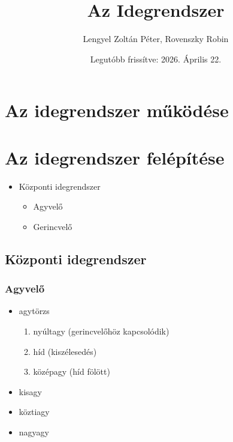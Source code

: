 \documentclass{article}
\title{Az Idegrendszer}
\author{Lengyel Zoltán Péter, Rovenszky Robin}
\date{Legutóbb frissítve: 2026. Április 22.}
\begin{document}
\section{Az idegrendszer működése}

\section{Az idegrendszer felépítése}
\begin{itemize}
    \item Központi idegrendszer \begin{itemize}
        \item Agyvelő
        \item Gerincvelő
    \end{itemize}
\end{itemize}

\subsection{Központi idegrendszer}
\subsubsection{Agyvelő}
\begin{itemize}
    \item agytörzs \begin{enumerate}
        \item nyúltagy (gerincvelőhöz kapcsolódik)
        \item híd (kiszélesedés)
        \item középagy (híd fölött)
    \end{enumerate}
    \item kisagy
    \item köztiagy
    \item nagyagy
\end{itemize}
\end{document}
